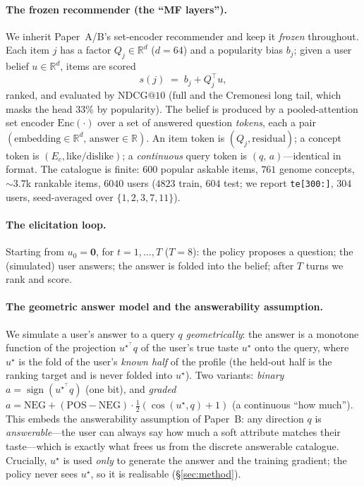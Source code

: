 \documentclass[11pt]{article}
\newcommand{\R}{\mathbb{R}}
\newcommand{\ustar}{u^{\star}}
\begin{document}
\paragraph{The frozen recommender (the ``MF layers'').} We inherit Paper~A/B's set-encoder recommender and keep it
\emph{frozen} throughout. Each item $j$ has a factor $Q_j\in\R^{d}$ ($d=64$) and a popularity bias $b_j$; given a user
belief $u\in\R^{d}$, items are scored
\begin{equation}
  s(j) \;=\; b_j + Q_j^{\top}u,
\end{equation}
ranked, and evaluated by $\mathrm{NDCG@10}$ (full and the Cremonesi long tail, which masks the head $33\%$ by
popularity). The belief is produced by a pooled-attention set encoder $\mathrm{Enc}(\cdot)$ over a set of answered
question \emph{tokens}, each a pair $(\text{embedding}\in\R^{d},\,\text{answer}\in\R)$. An item token is
$(Q_j,\text{residual})$; a concept token is $(E_c,\text{like/dislike})$; a \emph{continuous} query token is
$(q,\,a)$---identical in format. The catalogue is finite: $600$ popular askable items, $761$ genome concepts, ${\sim}3.7$k
rankable items, $6040$ users ($4823$ train, $604$ test; we report \texttt{te[300:]}, $304$ users, seed-averaged over
$\{1,2,3,7,11\}$).

\paragraph{The elicitation loop.} Starting from $u_0=\mathbf{0}$, for $t=1,\dots,T$ ($T{=}8$): the policy proposes a
question; the (simulated) user answers; the answer is folded into the belief; after $T$ turns we rank and score.

\paragraph{The geometric answer model and the answerability assumption.} We simulate a user's answer to a query $q$
\emph{geometrically}: the answer is a monotone function of the projection $\ustar^{\top}q$ of the user's true taste
$\ustar$ onto the query, where $\ustar$ is the fold of the user's \emph{known half} of the profile (the held-out half is
the ranking target and is never folded into $\ustar$). Two variants: \emph{binary} $a=\operatorname{sign}(\ustar^{\top}q)$
(one bit), and \emph{graded} $a = \mathrm{NEG} + (\mathrm{POS}-\mathrm{NEG})\cdot\tfrac{1}{2}\!\left(\cos(\ustar,q)+1\right)$
(a continuous ``how much''). This embeds the answerability assumption of Paper~B: any direction $q$ is
\emph{answerable}---the user can always say how much a soft attribute matches their taste---which is exactly what frees
us from the discrete answerable catalogue. Crucially, $\ustar$ is used \emph{only} to generate the answer and the
training gradient; the policy never sees $\ustar$, so it is realisable (\S\ref{sec:method}).
\end{document}

